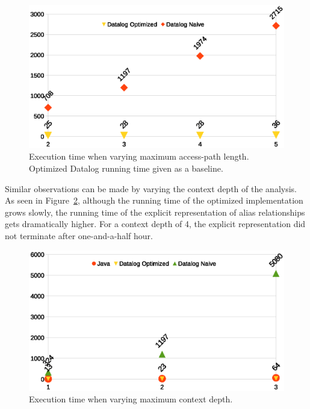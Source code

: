 \begin{figure}[htp]
\centering
\includegraphics[clip,width=\linewidth]{assets/must-data/length.eps}
\caption{Execution time when varying maximum access-path length. Optimized Datalog running time given as a baseline.}
\label{fig:must-data:aplength-chart}
\end{figure}


Similar observations can be made by varying the context depth of the analysis. As seen in Figure~\ref{fig:must-data:ctxdepth-chart}, although the running time of the optimized implementation grows slowly, the running time of the explicit representation of alias relationships gets dramatically higher. For a context depth of 4, the explicit representation did not terminate after one-and-a-half hour.

\begin{figure}[htp]
\centering
\includegraphics[clip,width=\linewidth]{assets/must-data/depth.eps}
\caption{Execution time when varying maximum context depth.}
\label{fig:must-data:ctxdepth-chart}
\end{figure}

